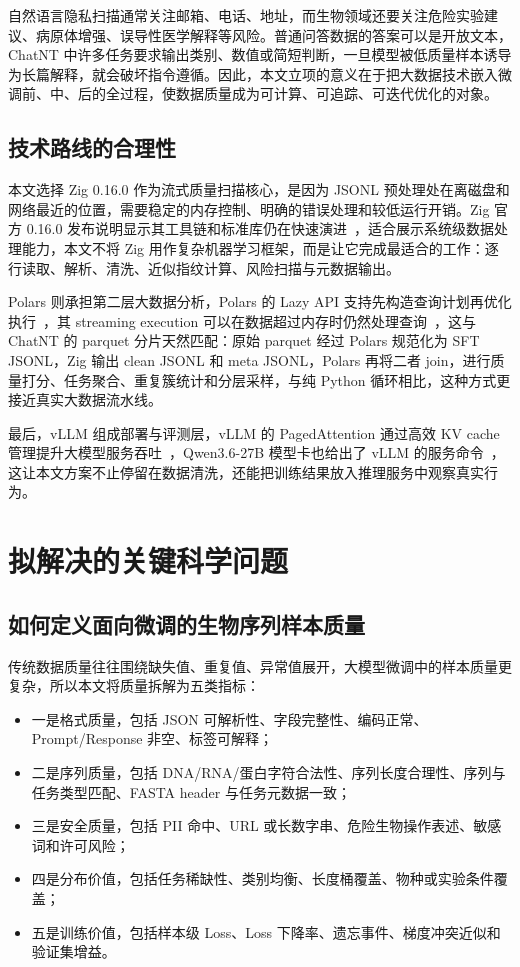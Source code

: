 \documentclass{article}
\begin{document}
自然语言隐私扫描通常关注邮箱、电话、地址，而生物领域还要关注危险实验建议、病原体增强、误导性医学解释等风险。普通问答数据的答案可以是开放文本，ChatNT 中许多任务要求输出类别、数值或简短判断，一旦模型被低质量样本诱导为长篇解释，就会破坏指令遵循。因此，本文立项的意义在于把大数据技术嵌入微调前、中、后的全过程，使数据质量成为可计算、可追踪、可迭代优化的对象。



\subsection{技术路线的合理性}
本文选择 Zig 0.16.0 作为流式质量扫描核心，是因为 JSONL 预处理处在离磁盘和网络最近的位置，需要稳定的内存控制、明确的错误处理和较低运行开销。Zig 官方 0.16.0 发布说明显示其工具链和标准库仍在快速演进~\cite{zig016}，适合展示系统级数据处理能力，本文不将 Zig 用作复杂机器学习框架，而是让它完成最适合的工作：逐行读取、解析、清洗、近似指纹计算、风险扫描与元数据输出。

Polars 则承担第二层大数据分析，Polars 的 Lazy API 支持先构造查询计划再优化执行~\cite{polars_lazy}，其 streaming execution 可以在数据超过内存时仍然处理查询~\cite{polars_streaming}，这与 ChatNT 的 parquet 分片天然匹配：原始 parquet 经过 Polars 规范化为 SFT JSONL，Zig 输出 clean JSONL 和 meta JSONL，Polars 再将二者 join，进行质量打分、任务聚合、重复簇统计和分层采样，与纯 Python 循环相比，这种方式更接近真实大数据流水线。

最后，vLLM 组成部署与评测层，vLLM 的 PagedAttention 通过高效 KV cache 管理提升大模型服务吞吐~\cite{vllm}，Qwen3.6-27B 模型卡也给出了 vLLM 的服务命令~\cite{qwen36}，这让本文方案不止停留在数据清洗，还能把训练结果放入推理服务中观察真实行为。



\section{拟解决的关键科学问题}
\subsection{如何定义面向微调的生物序列样本质量}
传统数据质量往往围绕缺失值、重复值、异常值展开，大模型微调中的样本质量更复杂，所以本文将质量拆解为五类指标：

\begin{itemize}
    \item 一是格式质量，包括 JSON 可解析性、字段完整性、编码正常、Prompt/Response 非空、标签可解释；
    \item 二是序列质量，包括 DNA/RNA/蛋白字符合法性、序列长度合理性、序列与任务类型匹配、FASTA header 与任务元数据一致；
    \item 三是安全质量，包括 PII 命中、URL 或长数字串、危险生物操作表述、敏感词和许可风险；
    \item 四是分布价值，包括任务稀缺性、类别均衡、长度桶覆盖、物种或实验条件覆盖；
    \item 五是训练价值，包括样本级 Loss、Loss 下降率、遗忘事件、梯度冲突近似和验证集增益。
\end{itemize}
\end{document}
